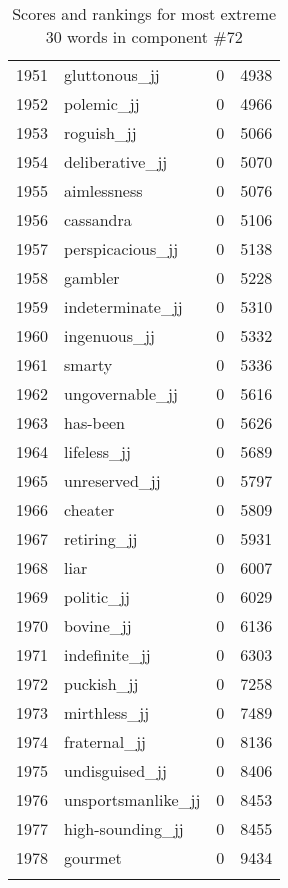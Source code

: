 \begin{longtable}[!htbp]{| rlr@{.}l |}
    1951 & gluttonous\_jj & 0 & 4938 \\
    1952 & polemic\_jj & 0 & 4966 \\
    1953 & roguish\_jj & 0 & 5066 \\
    1954 & deliberative\_jj & 0 & 5070 \\
    1955 & aimlessness & 0 & 5076 \\
    1956 & cassandra & 0 & 5106 \\
    1957 & perspicacious\_jj & 0 & 5138 \\
    1958 & gambler & 0 & 5228 \\
    1959 & indeterminate\_jj & 0 & 5310 \\
    1960 & ingenuous\_jj & 0 & 5332 \\
    1961 & smarty & 0 & 5336 \\
    1962 & ungovernable\_jj & 0 & 5616 \\
    1963 & has-been & 0 & 5626 \\
    1964 & lifeless\_jj & 0 & 5689 \\
    1965 & unreserved\_jj & 0 & 5797 \\
    1966 & cheater & 0 & 5809 \\
    1967 & retiring\_jj & 0 & 5931 \\
    1968 & liar & 0 & 6007 \\
    1969 & politic\_jj & 0 & 6029 \\
    1970 & bovine\_jj & 0 & 6136 \\
    1971 & indefinite\_jj & 0 & 6303 \\
    1972 & puckish\_jj & 0 & 7258 \\
    1973 & mirthless\_jj & 0 & 7489 \\
    1974 & fraternal\_jj & 0 & 8136 \\
    1975 & undisguised\_jj & 0 & 8406 \\
    1976 & unsportsmanlike\_jj & 0 & 8453 \\
    1977 & high-sounding\_jj & 0 & 8455 \\
    1978 & gourmet & 0 & 9434 \\
    \hline
    \caption{Scores and rankings for most extreme 30 words in component \#72} \\
\end{longtable}

